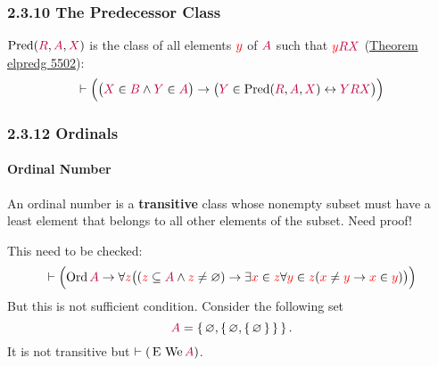\documentclass[12pt, letterpaper]{article}
\newcommand{\red}[1]{{\color{red} #1}}
\newcommand{\purple}[1]{{\color{purple} #1}}
\renewcommand{\emptyset}{\varnothing}
\newcommand{\provable}{\vdash}
\newcommand{\ra}{\rightarrow}
\newcommand{\lra}{\leftrightarrow}
\newcommand{\setvar}{\red}
\newcommand{\classvar}{\purple}
\newcommand{\sx}{\setvar{x}}
\newcommand{\sy}{\setvar{y}}
\newcommand{\sz}{\setvar{z}}
\newcommand{\clA}{\classvar{A}}
\newcommand{\clB}{\classvar{B}}
\newcommand{\clR}{\classvar{R}}
\newcommand{\clX}{\classvar{X}}
\newcommand{\clY}{\classvar{Y}}
\newcommand{\We}{{\,\mathrm{We}\,}}
\newcommand{\relE}{{\,\operatorname{E}\,}}
\newcommand{\Ord}{{\operatorname{Ord}\,}}
\newcommand{\Pred}{{\operatorname{Pred}}}
\theoremstyle{definition}
\theoremstyle{remark}
\theoremstyle{definition}
\theoremstyle{plain}
\begin{document}
	\subsubsection*{2.3.10  The Predecessor Class}
	$\Pred(\clR,\clA,\clX)$ is the class of all elements $\sy$ of $\clA$ such that $\sy\clR\clX$
	(\href{http://us.metamath.org/mpeuni/mmtheorems56.html}{Theorem	elpredg 5502}):
	\[\provable\Big( \big(\clX\in\clB\land\clY\in\clA\big)\ra\big(\clY\in\Pred(\clR,\clA,\clX)\lra\clY\clR\clX \big)\Big) \]
	
	\subsubsection*{2.3.12  Ordinals}
	\paragraph{Ordinal Number}
	An ordinal number is a \textbf{transitive} class
	whose nonempty subset must have a least element that belongs to all other elements of the subset.
	\red{Need proof!}
	
	\red{This need to be checked:}
	\[ \provable \Big(\Ord\clA\ra\forall \sz \big((\sz\subseteq\clA\land\sz\ne\emptyset)\ra \exists\sx\in\sz\forall\sy\in\sz(\sx\ne\sy\ra\sx\in\sy)\big)\Big) \]
	But this is not sufficient condition. Consider the following set
	\[\clA=\set{\emptyset,\set{\emptyset,\set{\emptyset}}}. \]
	It is not transitive but $\provable( \relE \We \clA )$.
	
\end{document}
